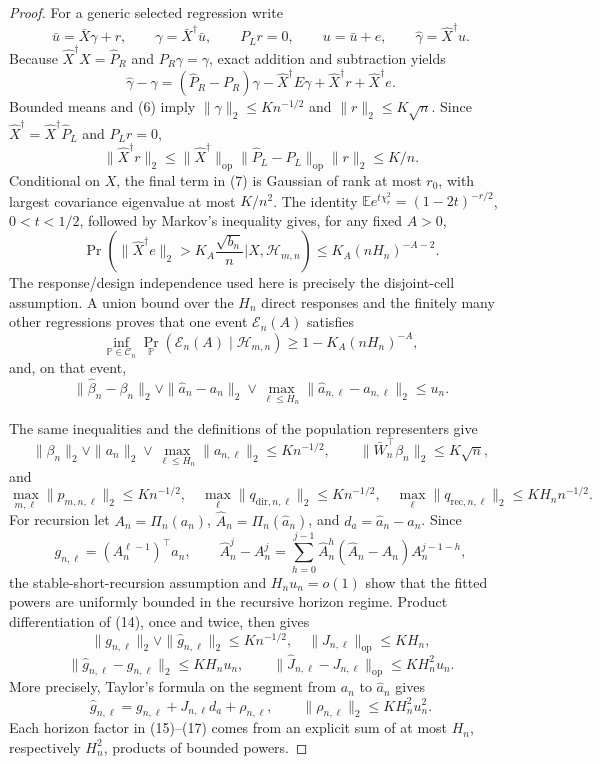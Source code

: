 \documentclass{article}
\begin{document}
\begin{proof}
For a generic selected regression write
\[
 \bar u=\bar X\gamma+r,\qquad
 \gamma=\bar X^\dagger\bar u,\qquad P_Lr=0,\qquad
 u=\bar u+e,\qquad \widehat\gamma=\widehat X^\dagger u.
\]
Because \(\widehat X^\dagger X=\widehat P_R\) and \(P_R\gamma=\gamma\), exact addition and subtraction yields
\[
 \widehat\gamma-\gamma
 = (\widehat P_R-P_R)\gamma-
   \widehat X^\dagger E\gamma+
   \widehat X^\dagger r+
   \widehat X^\dagger e.
 \tag{7}
\]
Bounded means and (6) imply \(\|\gamma\|_2\le K n^{-1/2}\) and \(\|r\|_2\le K\sqrt n\).  Since \(\widehat X^\dagger=\widehat X^\dagger\widehat P_L\) and \(P_Lr=0\),
\[
 \|\widehat X^\dagger r\|_2
 \le \|\widehat X^\dagger\|_{\mathrm{op}}
      \|\widehat P_L-P_L\|_{\mathrm{op}}\|r\|_2
 \le K/n.
 \tag{8}
\]
Conditional on \(X\), the final term in (7) is Gaussian of rank at most \(r_0\), with largest covariance eigenvalue at most \(K/n^2\).  The identity
\(\mathbb E e^{t\chi_r^2}=(1-2t)^{-r/2}\), \(0<t<1/2\), followed by Markov's inequality gives, for any fixed \(A>0\),
\[
 \Pr\!\left(\|\widehat X^\dagger e\|_2>K_A\frac{\sqrt{b_n}}n
       \mathrel{\big|}X,\mathcal H_{m,n}\right)
 \le K_A(nH_n)^{-A-2}.
 \tag{9}
\]
The response/design independence used here is precisely the disjoint-cell assumption.  A union bound over the \(H_n\) direct responses and the finitely many other regressions proves that one event \(\mathcal E_n(A)\) satisfies
\[
 \inf_{\mathbb P\in\mathcal C_n}
 \Pr_{\mathbb P}\!\left(\mathcal E_n(A)\mid\mathcal H_{m,n}\right)
 \ge1-K_A(nH_n)^{-A},
 \tag{10}
\]
and, on that event,
\[
 \|\widehat\beta_n-\beta_n\|_2\vee
 \|\widehat a_n-a_n\|_2\vee
 \max_{\ell\le H_n}\|\widehat a_{n,\ell}-a_{n,\ell}\|_2
 \le u_n.
 \tag{11}
\]

The same inequalities and the definitions of the population representers give
\[
 \|\beta_n\|_2\vee\|a_n\|_2\vee
 \max_{\ell\le H_n}\|a_{n,\ell}\|_2\le K n^{-1/2},\qquad
 \|\bar W_n^\top\beta_n\|_2\le K\sqrt n,
 \tag{12}
\]
and
\[
 \max_{m,\ell}\|p_{m,n,\ell}\|_2\le K n^{-1/2},\quad
 \max_\ell\|q_{\mathrm{dir},n,\ell}\|_2\le K n^{-1/2},\quad
 \max_\ell\|q_{\mathrm{rec},n,\ell}\|_2\le K H_n n^{-1/2}.
 \tag{13}
\]
For recursion let \(A_n=\Pi_n(a_n)\), \(\widehat A_n=\Pi_n(\widehat a_n)\), and \(d_a=\widehat a_n-a_n\).  Since
\[
 g_{n,\ell}=(A_n^{\ell-1})^\top a_n,\qquad
 \widehat A_n^j-A_n^j=
 \sum_{h=0}^{j-1}\widehat A_n^h(\widehat A_n-A_n)A_n^{j-1-h},
 \tag{14}
\]
the stable-short-recursion assumption and \(H_nu_n=o(1)\) show that the fitted powers are uniformly bounded in the recursive horizon regime.  Product differentiation of (14), once and twice, then gives
\[
 \|g_{n,\ell}\|_2\vee\|\widehat g_{n,\ell}\|_2\le K n^{-1/2},\quad
 \|J_{n,\ell}\|_{\mathrm{op}}\le KH_n,
 \tag{15}
\]
\[
 \|\widehat g_{n,\ell}-g_{n,\ell}\|_2\le KH_nu_n,\qquad
 \|\widehat J_{n,\ell}-J_{n,\ell}\|_{\mathrm{op}}\le KH_n^2u_n.
 \tag{16}
\]
More precisely, Taylor's formula on the segment from \(a_n\) to \(\widehat a_n\) gives
\[
 \widehat g_{n,\ell}=g_{n,\ell}+J_{n,\ell}d_a+\rho_{n,\ell},\qquad
 \|\rho_{n,\ell}\|_2\le KH_n^2u_n^2.
 \tag{17}
\]
Each horizon factor in (15)--(17) comes from an explicit sum of at most \(H_n\), respectively \(H_n^2\), products of bounded powers.


\end{proof}
\end{document}
